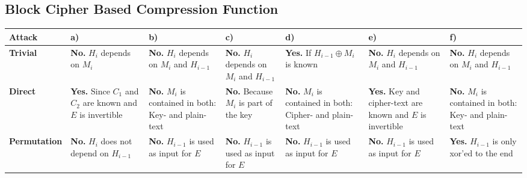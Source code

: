 







\begin{landscape}

\section{Block Cipher Based Compression Function}

\renewcommand{\arraystretch}{2}
\begin{table}[H]
    \begin{center}
        \begin{tabularx}{24cm}[]{lAAAAAA}
            \hline
             \textbf{Attack} & \textbf{a)} & \textbf{b)} & \textbf{c)} & \textbf{d)} & \textbf{e)} & \textbf{f)}  \\
            \hline
                \textbf{Trivial}
                    & \textbf{No.} $H_i$ depends on $M_i$
                    & \textbf{No.} $H_i$ depends on $M_i$ and $H_{i-1}$
                    & \textbf{No.} $H_i$ depends on $M_i$ and $H_{i-1}$
                    & \textbf{Yes.} If $H_{i-1} \oplus M_i$ is known
                    & \textbf{No.} $H_i$ depends on $M_i$ and $H_{i-1}$
                    & \textbf{No.} $H_i$ depends on $M_i$ and $H_{i-1}$
                    \\
                 \textbf{Direct}
                    & \textbf{Yes.} Since $C_1$ and $C_2$ are known and $E$ is invertible
                    & \textbf{No.}  $M_i$ is contained in both: Key- and plain-text
                    & \textbf{No.}  Because $M_i$ is part of the key
                    & \textbf{No.}  $M_i$ is contained in both: Cipher- and plain-text
                    & \textbf{Yes.} Key and cipher-text are known and $E$ is invertible
                    & \textbf{No.}  $M_i$ is contained in both: Key- and plain-text
                    \\
                \textbf{Permutation}
                    & \textbf{No.}  $H_i$ does not depend on $H_{i-1}$
                    & \textbf{No.}  $H_{i-1}$ is used as input for $E$
                    & \textbf{No.}  $H_{i-1}$ is used as input for $E$
                    & \textbf{No.}  $H_{i-1}$ is used as input for $E$
                    & \textbf{No.}  $H_{i-1}$ is used as input for $E$
                    & \textbf{Yes.} $H_{i-1}$ is only xor'ed to the end
                    \\

\end{tabularx}
\end{center}
\end{table}
\end{landscape}
